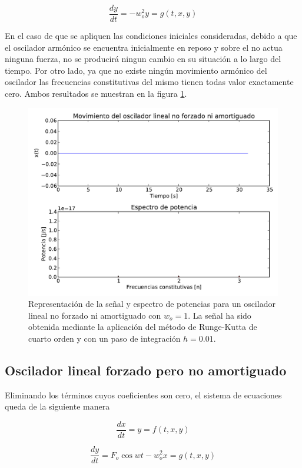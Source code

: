 \documentclass[11pt]{article}
\begin{document}
\begin{equation}
	\frac{dy}{dt} = -w_o^2 y = g(t, x, y)
\end{equation}

En el caso de que se apliquen las condiciones iniciales consideradas, debido a que el oscilador armónico se encuentra inicialmente en reposo y sobre el no actua ninguna fuerza, no se producirá ningun cambio en su situación a lo largo del tiempo. Por otro lado, ya que no existe ningún movimiento armónico del oscilador las frecuencias constitutivas del mismo tienen todas valor exactamente cero. Ambos resultados se muestran en la figura \ref{fig:caso_lineal}.

\begin{figure}
\centering
\includegraphics[width=0.75\linewidth]{caso_lineal.pdf}
\caption{Representación de la señal y espectro de potencias para un oscilador lineal no forzado ni amortiguado con $w_o = 1$. La señal ha sido obtenida mediante la aplicación del método de Runge-Kutta de cuarto orden y con un paso de integración $h = 0.01$.}
\label{fig:caso_lineal}
\end{figure}

\subsection{Oscilador lineal forzado pero no amortiguado}
Eliminando los términos cuyos coeficientes son cero, el sistema de ecuaciones queda de la siguiente manera

\begin{equation}
	\frac{dx}{dt} = y = f(t, x, y)
\end{equation}

\begin{equation}
	\frac{dy}{dt} = F_o\cos{wt} - w_o^2 x = g(t, x, y) 	
\end{equation}
\end{document}
